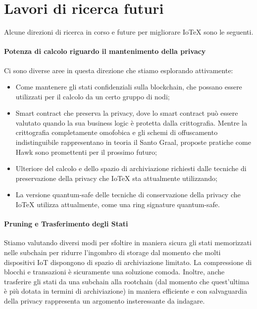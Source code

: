 \section{Lavori di ricerca futuri}
Alcune direzioni di ricerca in corso e future per migliorare IoTeX sono le seguenti.
\paragraph{Potenza di calcolo riguardo il mantenimento della privacy}
Ci sono diverse aree in questa direzione che stiamo esplorando attivamente:

\begin{itemize}
    \item Come mantenere gli stati confidenziali sulla blockchain, che possano essere utilizzati per il calcolo da un certo gruppo di nodi;

\item Smart contract che preserva la privacy, dove lo smart contract può essere valutato quando la sua business logic è protetta dalla crittografia. Mentre la crittografia completamente omofobica \cite{c26} e gli schemi di offuscamento indistinguibile \cite{c11} rappresentano in teoria il Santo Graal,
proposte pratiche come Hawk \cite{c17} sono promettenti per il prossimo futuro;

\item Ulteriore del calcolo e dello spazio di archiviazione richiesti dalle tecniche di preservazione della privacy che IoTeX sta attualmente utilizzando;

\item La versione quantum-safe delle tecniche di conservazione della privacy che IoTeX utilizza attualmente, come una ring signature quantum-safe.
\end{itemize}



\paragraph{Pruning e Trasferimento degli Stati}
Stiamo valutando diversi modi per sfoltire in maniera sicura gli stati memorizzati nelle subchain per ridurre l'ingombro di storage dal momento che molti dispositivi IoT dispongono di spazio di archiviazione limitato. La compressione di blocchi e transazioni è sicuramente una soluzione comoda. Inoltre, anche trasferire gli stati da una subchain alla rootchain (dal momento che quest'ultima è più dotata in termini di archiviazione) in maniera efficiente e con salvaguardia della privacy rappresenta un argomento insteressante da indagare.

